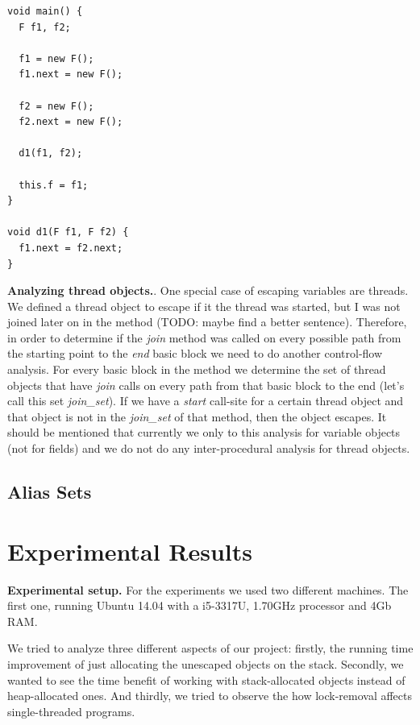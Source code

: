 \documentclass[letterpaper]{article}
\newcommand{\mypar}[1]{{\bf #1.}}
\begin{document}
\begin{lstlisting}[caption=Field parameter assignment, label=lst:fields]
void main() {
  F f1, f2;

  f1 = new F();
  f1.next = new F();

  f2 = new F();
  f2.next = new F();

  d1(f1, f2);

  this.f = f1;
}

void d1(F f1, F f2) {
  f1.next = f2.next;
}
\end{lstlisting}

\mypar{Analyzing thread objects}. One special case of escaping variables are threads. We defined a thread object to escape if
it the thread was started, but I was not joined later on in the method (TODO: maybe find a better sentence).
Therefore, in order to determine if the \textit{join} method was called on every possible path from the starting point
to the \textit{end} basic block we need to do another control-flow analysis. For every basic block in the method we 
determine the set of thread objects that have \textit{join} calls on every path from that basic block to the end (let's call this set \textit{join\_set}).
If we have a \textit{start} call-site for a certain thread object and that object is not in the \textit{join\_set} of that
method, then the object escapes.
It should be mentioned that currently we only to this analysis for variable objects (not for fields) and we do not do any inter-procedural analysis for thread objects.

\subsection{Alias Sets}



\section{Experimental Results}\label{sec:exp}


\mypar{Experimental setup} For the experiments we used two different machines. The first one, running
Ubuntu 14.04 with a i5-3317U, 1.70GHz processor and 4Gb RAM.

We tried to analyze three different aspects of our project: firstly, the running time improvement of just allocating
the unescaped objects on the stack. Secondly, we wanted to see the time benefit of working with stack-allocated
objects instead of heap-allocated ones. And thirdly, we tried to observe the how lock-removal affects single-threaded
programs.\\
\end{document}
